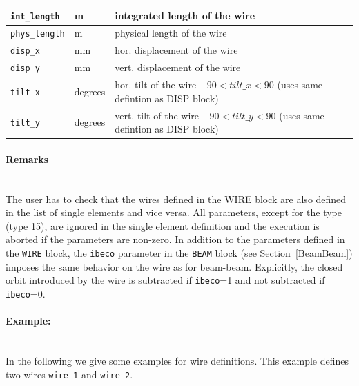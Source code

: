 \begin{center}
\begin{longtable}{|p{2.0cm} |p{1.4cm} |p{9.2cm}|}
    \texttt{int\_length} & m &
    integrated length of the wire\\*
    \hline

    \texttt{phys\_length} & m &
    physical length of the wire\\*
    \hline

    \texttt{disp\_x} & mm &
    hor. displacement of the wire\\*
    \hline

    \texttt{disp\_y} & mm &
    vert. displacement of the wire\\*
    \hline

    \texttt{tilt\_x} & degrees &
    hor. tilt of the wire $-90 < tilt\_x < 90$ (uses same defintion as DISP block) \\*
    \hline

    \texttt{tilt\_y} & degrees &
    vert. tilt of the wire $-90 < tilt\_y < 90$ (uses same defintion as DISP block) \\*
    \hline		
\end{longtable}
\end{center}

\paragraph{Remarks}~\\

The user has to check that the wires defined in the WIRE block are also defined in the list of single elements and vice versa.
All parameters, except for the type (type 15), are ignored in the single element definition and the execution is aborted if the parameters are non-zero.
In addition to the parameters defined in the \texttt{WIRE} block, the \texttt{ibeco} parameter in the \texttt{BEAM} block (see Section~\ref{BeamBeam}) imposes the same behavior on the wire as for beam-beam.
Explicitly, the closed orbit introduced by the wire is subtracted if \texttt{ibeco}=1 and not subtracted if \texttt{ibeco}=0.

\paragraph{Example:}~\\

In the following we give some examples for wire definitions.
This example defines two wires \texttt{wire\_1} and \texttt{wire\_2}.

